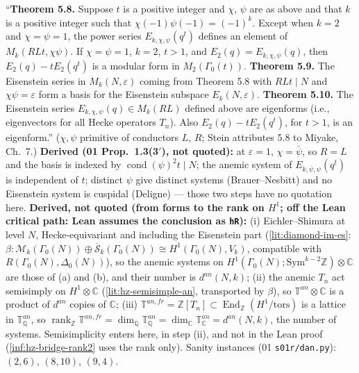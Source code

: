 \begin{hypothesis}
  ``\textbf{Theorem 5.8.} Suppose $t$ is a positive integer and $\chi$, $\psi$ are as above and that $k$ is a positive integer such that
  $\chi(-1)\psi(-1)=(-1)^k$. Except when $k=2$ and $\chi=\psi=1$, the power series $E_{k,\chi,\psi}(q^t)$ defines an element of
  $M_k(RLt,\chi\psi)$. If $\chi=\psi=1$, $k=2$, $t>1$, and $E_2(q)=E_{k,\chi,\psi}(q)$, then $E_2(q)-tE_2(q^t)$ is a modular form in
  $M_2(\Gamma_0(t))$. \textbf{Theorem 5.9.} The Eisenstein series in $M_k(N,\varepsilon)$ coming from Theorem 5.8 with $RLt\mid N$ and
  $\chi\psi=\varepsilon$ form a basis for the Eisenstein subspace $E_k(N,\varepsilon)$. \textbf{Theorem 5.10.} The Eisenstein series
  $E_{k,\chi,\psi}(q)\in M_k(RL)$ defined above are eigenforms (i.e., eigenvectors for all Hecke operators $T_n$). Also $E_2(q)-tE_2(q^t)$, for
  $t>1$, is an eigenform.'' ($\chi,\psi$ primitive of conductors $L$, $R$; Stein attributes 5.8 to Miyake, Ch.~7.)
  \textbf{Derived (01 Prop.~1.3(3$'$), not quoted):} at $\varepsilon=1$, $\chi=\bar\psi$, so $R=L$ and the basis is indexed by
  $\operatorname{cond}(\psi)^2t\mid N$; the anemic system of $E_{k,\bar\psi,\psi}(q^t)$ is independent of $t$; distinct $\psi$ give distinct
  systems (Brauer--Nesbitt) and no Eisenstein system is cuspidal (Deligne) --- those two steps have no quotation here.
  \textbf{Derived, not quoted (from forms to the rank on $H^1$; off the Lean critical path: Lean assumes the conclusion as \texttt{hR}):}
  (i) Eichler--Shimura at level $N$, Hecke-equivariant and including the Eisenstein part (\ref{lit:diamond-im-es}: $\beta\colon
  \mathcal M_k(\Gamma_0(N))\oplus\overline{\mathcal S}_k(\Gamma_0(N))\cong H^1(\Gamma_0(N),V_k)$, compatible with $R(\Gamma_0(N),\Delta_0(N))$),
  so the anemic systems on $H^1(\Gamma_0(N);\mathrm{Sym}^{k-2}\mathbb Z)\otimes\mathbb C$ are those of (a) and (b), and their number is $d^{an}(N,k)$;
  (ii) the anemic $T_n$ act semisimply on $H^1\otimes\mathbb C$ (\ref{lit:hz-semisimple-an}, transported by $\beta$), so
  $\mathbb T^{an}\otimes\mathbb C$ is a product of $d^{an}$ copies of $\mathbb C$; (iii) $\mathbb T^{an,fr}=\mathbb Z[T_n]\subset
  \operatorname{End}_{\mathbb Z}(H^1/\mathrm{tors})$ is a lattice in $\mathbb T^{an}_{\mathbb Q}$, so $\operatorname{rank}_{\mathbb Z}\mathbb T^{an,fr}
  =\dim_{\mathbb Q}\mathbb T^{an}_{\mathbb Q}=\dim_{\mathbb C}\mathbb T^{an}_{\mathbb C}=d^{an}(N,k)$, the number of systems. Semisimplicity enters
  here, in step (ii), and not in the Lean proof (\ref{inf:hz-bridge-rank2} uses the rank only).
  Sanity instances (01 \texttt{s01r/dan.py}): $(2,6)$, $(8,10)$, $(9,4)$.
\end{hypothesis}

